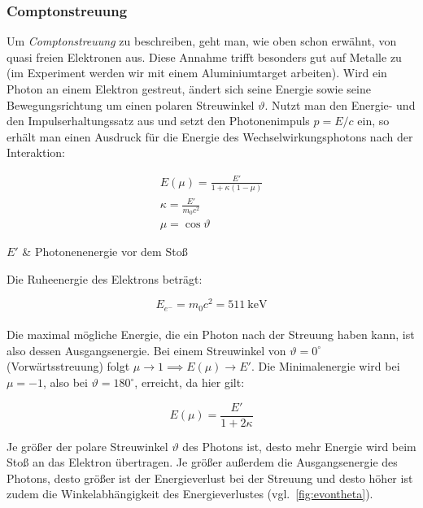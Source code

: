 \documentclass[slug=CS, room=Andreas-Schubert-Bau\,\ Labor\ 406,
supervisor=Juliane\ Volkmer, coursedate=29.\ 11.\ 2019]{../../Lab_Report_LaTeX/lab_report}
\newcommand{\cs}{\emph{Comptonstreuung }}
\begin{document}
\subsubsection{Comptonstreuung}
\label{sec:cs}

Um \cs zu beschreiben, geht man, wie oben schon erwähnt, von quasi freien Elektronen aus.
Diese Annahme trifft besonders gut auf Metalle zu (im Experiment werden wir mit einem Aluminiumtarget arbeiten).
Wird ein Photon an einem Elektron gestreut, ändert sich seine Energie sowie seine 
Bewegungsrichtung um einen polaren Streuwinkel \(\vartheta\). Nutzt man den Energie-
und den Impulserhaltungssatz aus und setzt den Photonenimpuls \(p = E/c\) ein, so erhält man
einen Ausdruck für die Energie des Wechselwirkungsphotons nach der Interaktion:

\begin{gather}
	E(\mu) = \frac{E'}{1 + \kappa(1 - \mu)} \label{eq:photoenergie}\\
	\kappa = \frac{E'}{m_0c^2}\\
	\mu = \cos\vartheta
\end{gather}

\begin{conditions}
	\(E'\) & Photonenenergie vor dem Stoß
\end{conditions}

Die Ruheenergie des Elektrons beträgt:

\begin{equation}\label{key}
	E_{e^-} = m_0c^2 = \SI{511}{\kilo\electronvolt}
\end{equation}\\

Die maximal mögliche Energie, die ein Photon nach der Streuung haben kann, ist also dessen
Ausgangsenergie. Bei einem Streuwinkel von \(\vartheta = 0^\circ\) (Vorwärtsstreuung) folgt
\(\mu \rightarrow 1 \implies E(\mu) \rightarrow E'\).
Die Minimalenergie wird bei \(\mu = -1\), also bei \(\vartheta = 180^\circ\), erreicht, da
hier gilt:

\begin{equation}\label{eq:emax}
	E(\mu) = \frac{E'}{1 + 2\kappa}
\end{equation}

Je größer der polare Streuwinkel \(\vartheta\) des Photons ist, desto mehr Energie wird beim Stoß
an das Elektron übertragen. Je größer außerdem die Ausgangsenergie des Photons, desto größer ist
der Energieverlust bei der Streuung und desto höher ist zudem die Winkelabhängigkeit des
Energieverlustes (vgl.~\ref{fig:evontheta}).\\
\end{document}
